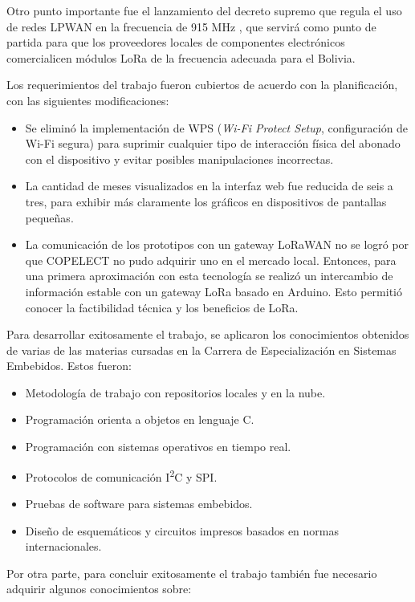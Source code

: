 Otro punto importante fue el lanzamiento del decreto supremo que regula el uso de redes LPWAN en la frecuencia de 915 MHz \citep{WEBSITE:27}, que servirá como punto de partida para que los proveedores locales de componentes electrónicos comercialicen módulos LoRa de la frecuencia adecuada para el Bolivia.

Los requerimientos del trabajo fueron cubiertos de acuerdo con la planificación, con las siguientes modificaciones:
\begin{itemize}
	\item Se eliminó la implementación de WPS (\textit{Wi-Fi Protect Setup}, configuración de Wi-Fi segura) para suprimir cualquier tipo de interacción física del abonado con el dispositivo y evitar posibles manipulaciones incorrectas.
	\item La cantidad de meses visualizados en la interfaz web fue reducida de seis a tres, para exhibir más claramente los gráficos en dispositivos de pantallas pequeñas.
		\item La comunicación de los prototipos con un gateway LoRaWAN no se logró por que COPELECT no pudo adquirir uno en el mercado local. Entonces, para una primera aproximación con esta tecnología se realizó un intercambio de información estable con un gateway LoRa basado en Arduino. Esto permitió conocer la factibilidad técnica y los beneficios de LoRa.
\end{itemize}

Para desarrollar exitosamente el trabajo, se aplicaron los conocimientos obtenidos de varias de las materias cursadas en la Carrera de Especialización en Sistemas Embebidos. Estos fueron:

\begin{itemize}
	\item Metodología de trabajo con repositorios locales y en la nube.
	\item Programación orienta a objetos en lenguaje C.
	\item Programación con sistemas operativos en tiempo real.
	\item Protocolos de comunicación I\textsuperscript{2}C y SPI.
	\item Pruebas de software para sistemas embebidos.
	\item Diseño de esquemáticos y circuitos impresos basados en normas internacionales.
\end{itemize}

Por otra parte, para concluir exitosamente el trabajo también fue necesario adquirir algunos conocimientos sobre:

